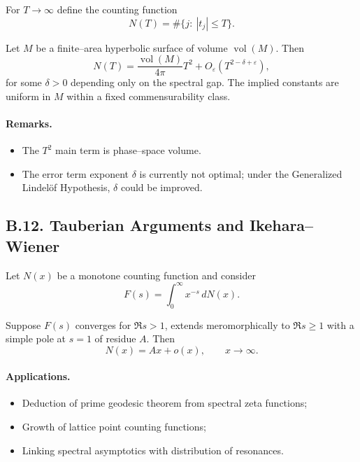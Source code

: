 For $T\to\infty$ define the counting function
\[
  N(T)=\#\{j:\ |t_j|\le T\}.
\]

\begin{theorem}\label{thm:B11}
Let $M$ be a finite–area hyperbolic surface of volume $\operatorname{vol}(M)$. Then
\begin{equation}
  N(T)=\frac{\operatorname{vol}(M)}{4\pi}T^2+O_\varepsilon(T^{2-\delta+\varepsilon}),
\end{equation}
for some $\delta>0$ depending only on the spectral gap. The implied constants
are uniform in $M$ within a fixed commensurability class.
\end{theorem}

\paragraph{Remarks.}
\begin{itemize}
  \item The $T^2$ main term is phase–space volume.
  \item The error term exponent $\delta$ is currently not optimal; under the
        Generalized Lindelöf Hypothesis, $\delta$ could be improved.
\end{itemize}

%

%
\subsection*{B.12. Tauberian Arguments and Ikehara–Wiener}

Let $N(x)$ be a monotone counting function and consider
\[
  F(s)=\int_0^\infty x^{-s}\,dN(x).
\]

\begin{lemma}\label{lem:B12}
Suppose $F(s)$ converges for $\Re s>1$, extends meromorphically to
$\Re s\ge1$ with a simple pole at $s=1$ of residue $A$. Then
\[
  N(x)=Ax+o(x),\qquad x\to\infty.
\]
\end{lemma}

\paragraph{Applications.}
\begin{itemize}
  \item Deduction of prime geodesic theorem from spectral zeta functions;
  \item Growth of lattice point counting functions;
  \item Linking spectral asymptotics with distribution of resonances.
\end{itemize}


